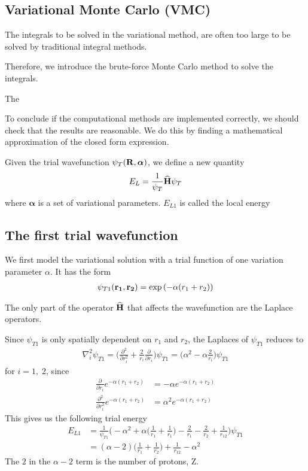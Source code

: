 \documentclass[twocolumn]{article}[12pt]
\newcommand{\eq}[1]{\begin{align*}#1\end{align*}}
\renewcommand\vec[1]{{\bf #1}}
\newcommand{\OP}[1]{{\bf\widehat{#1}}}
\begin{document}
\subsection{Variational Monte Carlo (VMC)}
The integrals to be solved in the variational method,
are often too large to be solved by traditional integral methods.

Therefore, we introduce the brute-force Monte Carlo method
to solve the integrals.

The 



To conclude if the computational methods are implemented correctly,
we should check that the results are reasonable. We do this by
finding a mathematical approximation of the closed form expression.

Given the trial wavefunction $\psi_T (\vec R, \boldsymbol\alpha)$, 
we define a new quantity
\eq{
  E_L = \frac{1}{\psi_T}\OP H \psi_T
}
where $\boldsymbol\alpha$ is a set of variational parameters.
$E_{L1}$ is called the local energy

\subsection{The first trial wavefunction}
We first model the variational solution with a trial function of one
variation parameter $\alpha$. It has the form
\eq{
\psi_{T1}({\bf r_1},{\bf r_2}) = 
   \exp{\left(-\alpha(r_1+r_2)\right)}
}

The only part of the operator $\OP H$ that affects the wavefunction
are the Laplace operators.

Since $\psi_{T1}$ is only spatially dependent on $r_1$ and $r_2$,
the Laplaces of $\psi_{T1}$ reduces to
\eq{
  \nabla_i^2 \psi_{T1} = \bigg( \frac{\partial^2}{\partial r_i^2} 
    + \frac{2}{r_i} \frac{\partial}{\partial r_i} \bigg) \psi_{T1}
    = \bigg( \alpha^2 -\alpha\frac{2}{r_i}  \bigg)\psi_{T1}
}
for $i = 1,\;2$, since
\eq{
  \frac{\partial}{\partial r_i} e^{-\alpha (r_1+r_2)}
    &= -\alpha e^{-\alpha (r_1+r_2)}\\
\frac{\partial^2}{\partial r_i^2} e^{-\alpha (r_1+r_2)}
    &= \alpha^2 e^{-\alpha (r_1+r_2)}
}
This gives us the following trial energy
\eq{
  E_{L1}&=\frac{1}{\psi_{T1}}\bigg( -\alpha^2 
  +\alpha\bigg( \frac{1}{r_1}+\frac{1}{r_1}  \bigg)
    -\frac{2}{r_1}-\frac{2}{r_2} + \frac{1}{r_{12}}
    \bigg)\psi_{T1}\\
  &=(\alpha-2)\bigg( \frac{1}{r_1}+\frac{1}{r_2} \bigg)
    +\frac{1}{r_{12}}-\alpha^2
}
The $2$ in the $\alpha-2$ term is the number of protons, Z.
\end{document}
